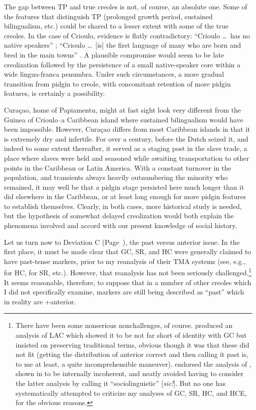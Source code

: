 The gap between TP and true creoles is not, of course, an abso\-lute one. Some of the features that distinguish TP (prolonged growth period, sustained bilingualism, etc.) could be shared to a lesser extent with some of the true creoles. In the case of Crioulo, evidence is flatly contradictory: ``Crioulo \ldots~has no native speakers'' \citep{Alleyne1979}; ``Crioulo \ldots~[is] the first language of many who are born and bred in the main towns'' \citep[vii]{Wilson1962}. A plausible compromise would seem to be late creolization followed by the persistence of a small native-speaker core within a wide lingua-franca penumbra. Under such circumstances, a more gradual transition from pidgin to creole, with concomitant retention of more pidgin features, is certainly a possibility. 

Curaçao, home of Papiamentu, might at fast sight look very different from the Guinea of Crioulo--a Caribbean island where sustained bilingualism would have been impossible. However, Curaçao differs from most Caribbean islands in that it is extremely dry and infertile. For over a century, before the Dutch seized it, and indeed to some extent thereafter, it served as a staging post in the slave trade, a place where slaves were held and seasoned while awaiting trans\-portation to other points in the Caribbean or Latin America. With a constant turnover in the population, and transients always heavily outnumbering the minority who remained, it may well be that a pidgin stage persisted here much longer than it did elsewhere in the Caribbean, or at least long enough for more pidgin features to establish themselves. Clearly, in both cases, more historical study is needed, but the hypothe\-sis of somewhat delayed creolization would both explain the phe\-nomena involved and accord with our present knowledge of social history.


Let us turn now to Deviation C (Page~\pageref{majordeviations}), the past versus anterior issue. In the first place, it must be made clear that GC, SR, and HC were generally claimed to have past-tense markers, prior to my re\-analysis of their TMA systems (see, e.g., \citet{Hall1953} for HC, \citet{Voorhoeve1957} for SR, etc.). However, that reanalysis has not been seriously challenged.\footnote{There have been some nonserious nonchallenges, of course. \citet{Christie1976} produced an analysis of LAC which showed it to be not far short of identity with GC but insisted on preserving traditional terms, obvious though it was that these did not fit (getting the distri\-bution of anterior correct and then calling it past is, to me at least, a quite incomprehensible maneuver). \citet{Seuren1980} endorsed the analysis of \citet{Voorhoeve1957}, shown in \citet{Bickerton1975} to be intern\-ally incoherent, and neatly avoided having to consider the latter analy\-sis by calling it ``sociolinguistic'' [\textit{sic!}]. But no one has systematically attempted to criticize my analyses of GC, SR, HC, and HCE, for the obvious reasons.} It seems reasonable, therefore, to suppose that in a number of other creoles which I did not specifically examine, markers are still being described as ``past'' which in reality are +anterior.

